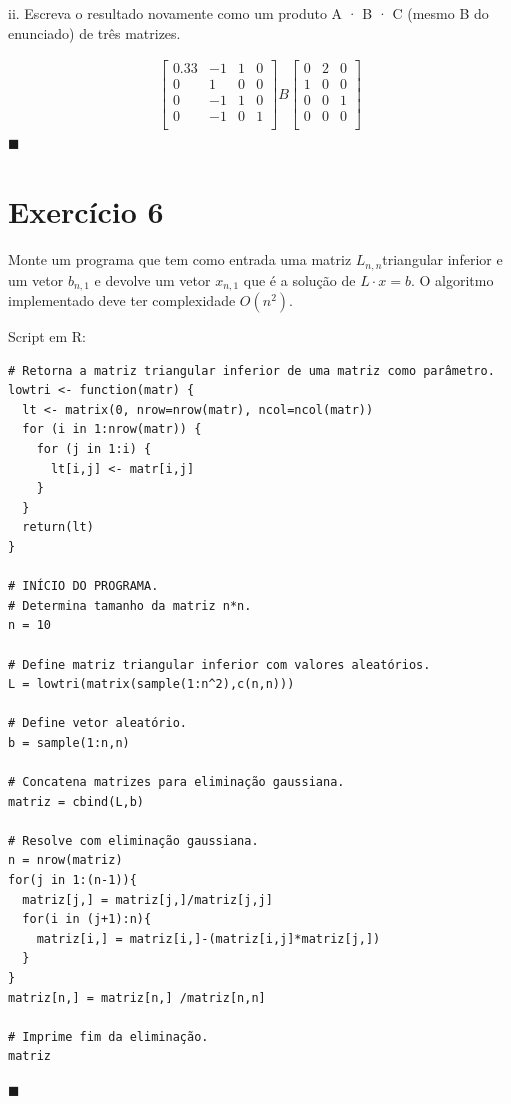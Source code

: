 \documentclass[12pt,a4paper]{article}
\newcommand{\qed}{\hfill $\blacksquare$}
\begin{document}
ii. Escreva o resultado novamente como um produto A · B · C (mesmo B do enunciado) de três matrizes.

\begin{align*}
\begin{bmatrix}{}
0.33 & -1 & 1 & 0 \\ 
0 & 1 & 0 & 0 \\ 
0 & -1 & 1 & 0 \\ 
0 & -1 & 0 & 1 \\ 
\end{bmatrix}
B
\begin{bmatrix}{}
0 & 2 & 0 \\ 
1 & 0 & 0 \\ 
0 & 0 & 1 \\ 
0 & 0 & 0 \\ 
\end{bmatrix}
\end{align*}
\qed 

\newpage
\section*{Exercício 6}
 Monte um programa que tem como entrada uma matriz $ L_{n,n}  $triangular inferior e um vetor $ b_{n,1} $ e
devolve um vetor $ x_{n,1} $ que é a solução de $ L\cdot x = b $. O algoritmo implementado deve ter complexidade
$ O(n^2) $.

Script em R:

\begin{verbatim}
# Retorna a matriz triangular inferior de uma matriz como parâmetro.
lowtri <- function(matr) {
  lt <- matrix(0, nrow=nrow(matr), ncol=ncol(matr))
  for (i in 1:nrow(matr)) {
    for (j in 1:i) {
      lt[i,j] <- matr[i,j]
    }
  }
  return(lt)
}

# INÍCIO DO PROGRAMA.
# Determina tamanho da matriz n*n.
n = 10

# Define matriz triangular inferior com valores aleatórios.
L = lowtri(matrix(sample(1:n^2),c(n,n)))

# Define vetor aleatório.
b = sample(1:n,n)

# Concatena matrizes para eliminação gaussiana.
matriz = cbind(L,b)

# Resolve com eliminação gaussiana.
n = nrow(matriz)
for(j in 1:(n-1)){
  matriz[j,] = matriz[j,]/matriz[j,j]
  for(i in (j+1):n){
    matriz[i,] = matriz[i,]-(matriz[i,j]*matriz[j,])
  }
}
matriz[n,] = matriz[n,] /matriz[n,n] 

# Imprime fim da eliminação.
matriz
\end{verbatim}
\qed
\end{document}
